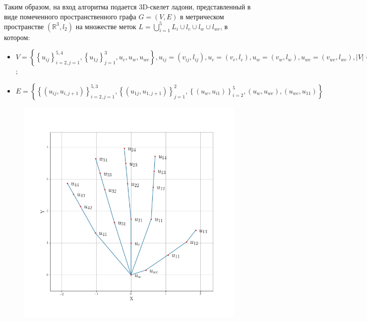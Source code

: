 \documentclass[12pt,a4paper]{article}
\theoremstyle{definition}
\begin{document}
Таким образом, на вход алгоритма подается 3D-скелет ладони, представленный в виде помеченного пространственного графа $G = (V, E)$ в метрическом пространстве $\left(\mathbb{R}^3, l_2\right)$ на множестве меток $L = \bigcup_{i=1}^5 L_i \cup l_c \cup l_w \cup l_{wc}$, в котором:
\begin{itemize}
\item $V = \left\{{\left\{u_{ij}\right\}}_{i=2,j=1}^{5,4}, {\left\{u_{1j}\right\}}_{j=1}^{3}, u_{c}, u_w, u_{wc}\right\}, u_{ij} = \left(v_{ij}, l_{ij}\right), u_c = \left(v_c, l_c\right), u_w = \left(v_w, l_w\right), u_{wc} = \left(v_{wc}, l_{wc}\right), |V| = |L| = 22$;
\item $E = \left\{ {\left\{\left(u_{ij}, u_{i,j+1}\right)\right\}}_{i=2, j=1}^{5, 3}, {\left\{\left(u_{1j}, u_{1,j+1}\right)\right\}}_{j=1}^{2}, {\left\{\left(u_w, u_{i1}\right)\right\}}_{i = 2}^{5}, \left(u_w, u_{wc}\right), \left(u_{wc}, u_{11}\right) \right\}$
\end{itemize}

\begin{figure}[h] 
	\center 
	\includegraphics[scale=0.35]{hand.jpeg} 
\end{figure}
\end{document}
